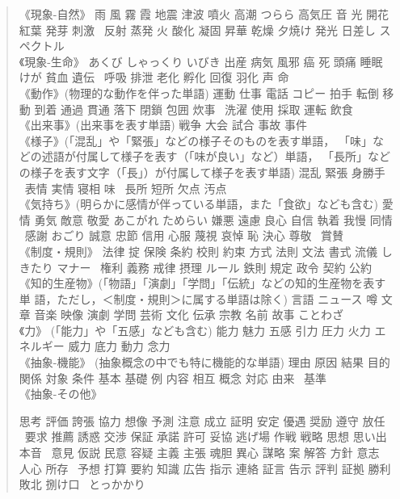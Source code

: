 \documentclass[a4j,titlepage]{jarticle}
\begin{document}
\begin{quote}
《現象-自然》
雨 風 霧 霞 地震 津波 噴火 高潮 つらら 高気圧 音 光 開花 紅葉 発芽 刺激
\ 反射 蒸発 火 酸化 凝固 昇華 乾燥 夕焼け 発光 日差し スペクトル \\

《現象-生命》
あくび しゃっくり いびき 出産 病気 風邪 癌 死 頭痛 睡眠 けが 貧血 遺伝
\ 呼吸 排泄 老化 孵化 回復 羽化 声 命 \\

《動作》(物理的な動作を伴った単語)
運動 仕事 電話 コピー 拍手 転倒 移動 到着 通過 貫通 落下 閉鎖 包囲 炊事
\ 洗濯 使用 採取 運転 飲食 \\

《出来事》(出来事を表す単語)
戦争 大会 試合 事故 事件 \\ 

《様子》(「混乱」や「緊張」などの様子そのものを表す単語，
「味」などの述語が付属して様子を表す（「味が良い」など）単語，
「長所」などの様子を表す文字（「長」）が付属して様子を表す単語)
混乱 緊張 身勝手 
\ 表情 実情 寝相 味
\ 長所 短所 欠点 汚点 \\

《気持ち》(明らかに感情が伴っている単語，また「食欲」なども含む)
愛情 勇気 敵意 敬愛 あこがれ ためらい 嫌悪 遠慮 良心 自信 執着 我慢 同情
\ 感謝 おごり 誠意 忠節 信用 心服 蔑視 哀悼 恥 決心 尊敬
\ 賞賛 \\

《制度・規則》
法律 掟 保険 条約 校則 約束 方式 法則 文法 書式 流儀 しきたり マナー 
\ 権利 義務 戒律 摂理 ルール 鉄則 規定 政令 契約 公約 \\

《知的生産物》(「物語」「演劇」「学問」「伝統」などの知的生産物を表す単
語，ただし，＜制度・規則＞に属する単語は除く)
言語 ニュース 噂 文章 音楽 映像 演劇 学問 芸術 文化 伝承 宗教 名前 故事
 ことわざ \\

 《力》
(「能力」や「五感」なども含む)
能力 魅力 五感 引力 圧力 火力 エネルギー 威力 底力 動力 念力 \\

《抽象-機能》
(抽象概念の中でも特に機能的な単語)
理由 原因 結果 目的 関係 対象 条件 基本 基礎 例 内容 相互 概念 対応 由来
\  基準 \\

《抽象-その他》

思考 評価 誇張 協力 想像 予測 注意 成立 証明 安定 優遇 奨励 遵守 放任 
\ 要求 推薦 誘惑 交渉 保証 承諾 許可 妥協 逃げ場 作戦 戦略 思想 思い出 本音 
\ 意見 仮説 民意 容疑 主義 主張 魂胆 異心 謀略 案 解答 方針 意志 人心 所存 
\ 予想 打算 要約 知識 広告 指示 連絡 証言 告示 評判 証拠 勝利 敗北 捌け口 
\ とっかかり
\end{quote}
\end{document}
